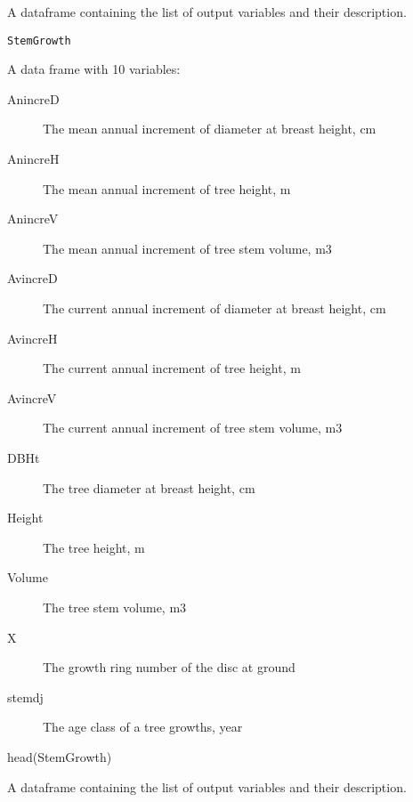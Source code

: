 \documentclass[a4paper]{book}
\begin{document}
%
\begin{Description}\relax
A dataframe containing the list of output variables and their description.
\end{Description}
%
\begin{Usage}
\begin{verbatim}
StemGrowth
\end{verbatim}
\end{Usage}
%
\begin{Format}
A data frame with 10 variables:
\begin{description}

\item[AnincreD] The mean annual increment of diameter at breast height, cm
\item[AnincreH] The mean annual increment of tree height, m
\item[AnincreV] The mean annual increment of tree stem volume, m3
\item[AvincreD] The current annual increment of diameter at breast height, cm
\item[AvincreH] The current annual increment of tree height, m
\item[AvincreV] The current annual increment of tree stem volume, m3
\item[DBHt] The tree diameter at breast height, cm
\item[Height] The tree height, m
\item[Volume] The tree stem volume, m3
\item[X] The growth ring number of the disc at ground
\item[stemdj] The age class of a tree growths, year

\end{description}

\end{Format}
%
\begin{Examples}
\begin{ExampleCode}
head(StemGrowth)
\end{ExampleCode}
\end{Examples}
%
\begin{Description}\relax
A dataframe containing the list of output variables and their description.
\end{Description}
\end{document}
